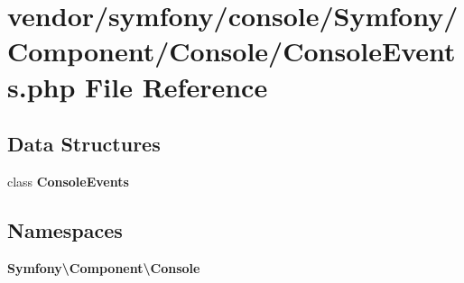 \section{vendor/symfony/console/\+Symfony/\+Component/\+Console/\+Console\+Events.php File Reference}
\label{_console_events_8php}
\subsection*{Data Structures}
\begin{DoxyCompactItemize}
\item 
class {\bf Console\+Events}
\end{DoxyCompactItemize}
\subsection*{Namespaces}
\begin{DoxyCompactItemize}
\item 
 {\bf Symfony\textbackslash{}\+Component\textbackslash{}\+Console}
\end{DoxyCompactItemize}
